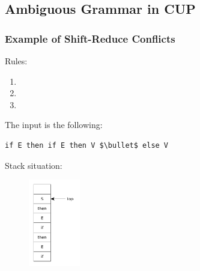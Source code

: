 \subsection{Ambiguous Grammar in CUP}
\subsubsection{Example of Shift-Reduce Conflicts}
Rules:
\begin{enumerate}
    \item
    \item
    \item
\end{enumerate}
The input is the following:
\begin{lstlisting}[mathescape]
if E then if E then V $\bullet$ else V
\end{lstlisting}

Stack situation:
\begin{figure}[H]
    \centerline{\includegraphics[width=0.2\textwidth]{img/20.pdf}}
\end{figure}

